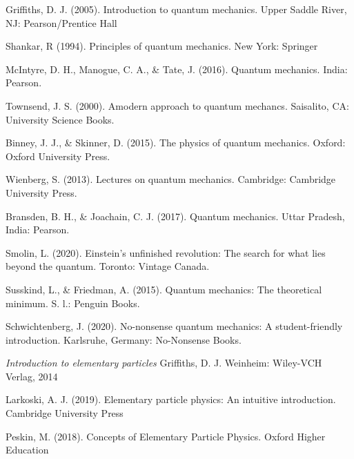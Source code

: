 \documentclass[a4paper,12pt]{book}
\begin{document}
\begin{thebibliography}{9}
	
	 Griffiths, D. J. (2005). Introduction to quantum mechanics. Upper Saddle River, NJ: Pearson/Prentice Hall 
	
	 Shankar, R (1994). Principles of quantum mechanics. New York: Springer
	
	 McIntyre, D. H., Manogue, C. A., \& Tate, J. (2016). Quantum mechanics. India: Pearson.
	
	 Townsend, J. S. (2000). Amodern approach to quantum mechancs. Saisalito, CA: University Science Books.
	
	  Binney, J. J., \& Skinner, D. (2015). The physics of quantum mechanics. Oxford: Oxford University Press.
	
	 Wienberg, S. (2013). Lectures on quantum mechanics. Cambridge: Cambridge University Press.
	
	  Bransden, B. H., \& Joachain, C. J. (2017). Quantum mechanics. Uttar Pradesh, India: Pearson.
	
	 Smolin, L. (2020). Einstein's unfinished revolution: The search for what lies beyond the quantum. Toronto: Vintage Canada.
	
	 Susskind, L., \& Friedman, A. (2015). Quantum mechanics: The theoretical minimum. S. l.: Penguin Books.
	
	 Schwichtenberg, J. (2020). No-nonsense quantum mechanics: A student-friendly introduction. Karlsruhe, Germany: No-Nonsense Books.
	
	 \emph{Introduction to elementary particles}
	\newblock Griffiths, D. J.
	\newblock Weinheim: Wiley-VCH Verlag, 2014
	
	 Larkoski, A. J. (2019). Elementary particle physics: An intuitive introduction. Cambridge University Press 
	
	 Peskin, M. (2018). Concepts of Elementary Particle Physics. Oxford Higher Education 
	
	
	
	

\end{thebibliography}
\end{document}
